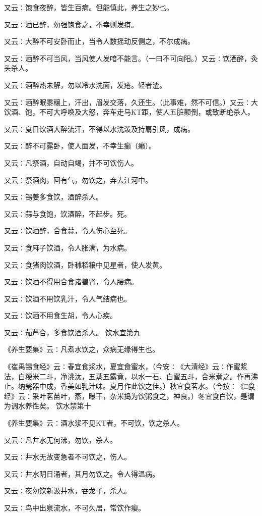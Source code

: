 \documentclass[a4paper,12pt,UTF8,twoside]{ctexbook}
\begin{document}
又云∶饱食夜醉，皆生百病。但能慎此，养生之妙也。

又云∶酒已醉，勿强饱食之，不幸则发疽。

又云∶大醉不可安卧而止，当令人数摇动反侧之，不尔成病。

又云∶酒醉不可当风，当风使人发喑不能言。（一曰不可向阳。）又云∶饮酒醉，灸头杀人。

又云∶酒醉热未解，勿以冷水洗面，发疮。轻者渣。

又云∶酒醉眠黍穣上，汗出，眉发交落，久还生。（此事难，然不可信。）又云∶大饮酒、饱，不可大呼唤及大怒，奔车走马KT距，使人五脏颠倒，或致断绝杀人。

又云∶夏日饮酒大醉流汗，不得以水洗泼及持扇引风，成病。

又云∶醉不可露卧，使人面发，不幸生癫（癞）。

又云∶凡祭酒，自动自竭，并不可饮伤人。

又云∶祭酒肉，回有气，勿饮之，弃去江河中。

又云∶锡姜多食饮，酒醉杀人。

又云∶蒜与食饱，饮酒醉，不起步。死。

又云∶饮酒醉，合食蒜，令人伤心至死。

又云∶食麻子饮酒，令人胀满，为水病。

又云∶食猪肉饮酒，卧秫稻穣中见星者，使人发黄。

又云∶饮酒不得用合食诸兽肾，令人腰病。

又云∶饮酒不用饮乳汁，令人气结病也。

又云∶饮酒不用食生胡，令人心疾。

又云∶茄芦合，多食饮酒杀人。
饮水宜第九

《养生要集》云∶凡煮水饮之，众病无缘得生也。

《崔禹锡食经》云∶春宜食浆水，夏宜食蜜水，（今安∶《大清经》云∶作蜜浆法，白粳米二斗，净洮汰，五蒸五露竟，以水一石、白蜜五斗，合米煮之。作再沸止。纳瓮器中成，香美如乳汁味。夏月作此饮之佳。）秋宜食茗水。（今按∶《□食经》云∶采叶茗苗叶，蒸，曝干，杂米捣为饮粥食之，神良。）冬宜食白饮，是谓为调水养性矣。
饮水禁第十

《养生要集》云∶酒水浆不见KT者，不可饮，饮之杀人。

又云∶凡井水无何沸，勿饮，杀人。

又云∶井水无故变急者不可饮之，伤人。

又云∶井水阴日涌者，其月勿饮之。令人得温病。

又云∶夜勿饮新汲井水，吞龙子，杀人。

又云∶鸟中出泉流水，不可久居，常饮作瘿。
\end{document}
